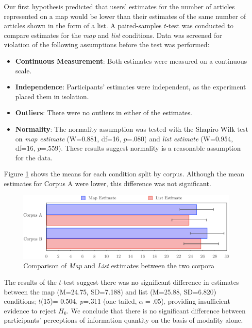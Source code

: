 Our first hypothesis predicted that users' estimates for the number of articles represented on a map would be lower than their estimates of the same number of articles shown in the form of a list. A paired-samples $t$-test was conducted to compare estimates for the \textit{map} and \textit{list} conditions. Data was screened for violation of the following assumptions before the test was performed:
\vspace{-0.2cm}
\begin{itemize}[itemsep=0.05em,leftmargin=0.7cm]
	\item \textbf{Continuous Measurement}: Both estimates were measured on a continuous scale.
	\item \textbf{Independence}: Participants' estimates were independent, as the experiment placed them in isolation.
	\item \textbf{Outliers}: There were no outliers in either of the estimates.
	\item \textbf{Normality}: The normality assumption was tested with the Shapiro-Wilk test on \textit{map estimate} (W=0.881, df=16, $p$=.080) and \textit{list estimate}  (W=0.954, df=16, $p$=.559). These results suggest normality is a reasonable assumption for the data.
\end{itemize}

Figure \ref{fig:estimate} shows the means for each condition split by corpus. Although the mean estimates for Corpus A were lower, this difference was not significant.

\begin{figure}[htbp!]
	\centering
	\includegraphics[width=.95\textwidth]{img/evaluation/estimate.pdf}
	\caption{Comparison of \textit{Map} and \textit{List} estimates between the two corpora}
	\label{fig:estimate}
\end{figure}

The results of the $t$-test suggest there was no significant difference in estimates between the map (M=24.75, SD=7.188) and list (M=25.88, SD=6.820) conditions; $t$(15)=-0.504, $p$=.311 (one-tailed, $\alpha=.05$), providing insufficient evidence to reject $H_0$. We conclude that there is no significant difference between participants' perceptions of information quantity on the basis of modality alone.


